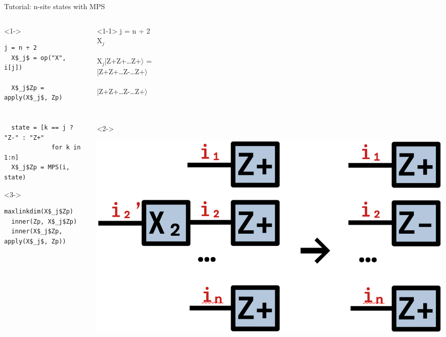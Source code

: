 \begin{frame}[fragile]{Tutorial: n-site states with MPS}

\begin{columns}

\begin{column}{6cm}

\begin{onlyenv}<1->
\begin{lstlisting}[language=JuliaLocal, style=julia, mathescape, basicstyle=\small]
  j = n ÷ 2
  X$_j$ = op("X", i[j])

  X$_j$Zp = apply(X$_j$, Zp)


  state = [k == j ? "Z-" : "Z+"
             for k in 1:n]
  X$_j$Zp = MPS(i, state)
\end{lstlisting}
\end{onlyenv}

\begin{onlyenv}<3->
\begin{lstlisting}[language=JuliaLocal, style=julia, mathescape, basicstyle=\small]
  maxlinkdim(X$_j$Zp)
  inner(Zp, X$_j$Zp)
  inner(X$_j$Zp, apply(X$_j$, Zp))
\end{lstlisting}
\end{onlyenv}

\end{column}

\begin{column}{4cm}

\begin{onlyenv}<1-1>
j = n ÷ 2 \\
X$_j$ \\
~\\
X$_j$|Z+Z+…Z+$\rangle$ = \\
    |Z+Z+…Z-…Z+$\rangle$ \\
~\\
|Z+Z+…Z-…Z+$\rangle$ \\
~\\
~\\
\end{onlyenv}

\begin{onlyenv}<2->
\vspace*{0.0cm}
\begin{center}
\includegraphics[width=1.0\textwidth]{
  slides/assets/XjZpn.png
}
\end{center}
\vspace*{0.0cm}
\end{onlyenv}


\end{column}
\end{columns}
\end{frame}
